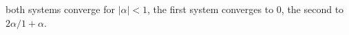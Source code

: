 \documentclass{report}
\begin{document}
both systems converge for $\left| \alpha \right| < 1$, the first system converges to
$0$, the second to $2 \alpha / 1 + \alpha$. \bigskip

%
%
%
%
%
%
%
\end{document}
